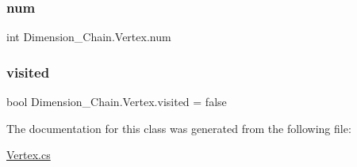 \subsubsection{\texorpdfstring{num}{num}}
{\footnotesize\ttfamily int Dimension\+\_\+\+Chain.\+Vertex.\+num}

\mbox{\label{class_dimension___chain_1_1_vertex_af2e30f955bb2d8cba8f8c4846ecc767d}} 
\subsubsection{\texorpdfstring{visited}{visited}}
{\footnotesize\ttfamily bool Dimension\+\_\+\+Chain.\+Vertex.\+visited = false}



The documentation for this class was generated from the following file\+:\begin{DoxyCompactItemize}
\item 
\mbox{\hyperlink{_vertex_8cs}{Vertex.\+cs}}\end{DoxyCompactItemize}
